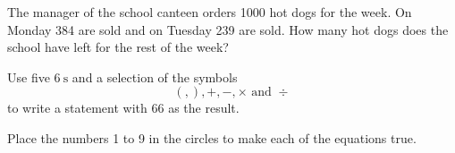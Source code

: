 \begin{homework}
\begin{questions}
        \Question[2] The manager of the school canteen orders 1000 hot dogs for the week. On Monday 384 are sold and on Tuesday 239 are sold. How many hot dogs does the school have left for the rest of the week?
            \begin{solutionordottedlines}[2in]
            \end{solutionordottedlines}
        \Question[2] Use five \(6 \mathrm{~s}\) and a selection of the symbols \[ (,),+,-, \times \text { and } \div \] to write a statement with 66 as the result.
            \begin{solutionordottedlines}[2in]
            \end{solutionordottedlines}
    \end{questions}
\end{homework}
\begin{challenge}
    \begin{questions}
        \Question[3] Place the numbers 1 to 9 in the circles to make each of the equations true.
        \begin{center}
\end{center}
\end{questions}
\end{challenge}
